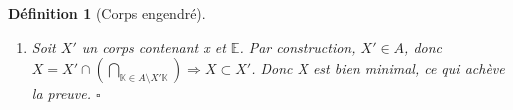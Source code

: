 \documentclass[a4paper,12pt,french]{report}
\newtheorem{definition}{Définition}[section]
\begin{document}
\begin{definition}[Corps engendré]
\begin{preuve}
\begin{enumerate}
\begin{enumerate}
\begin{enumerate}
								\[{}
								\forall \; \mathbb{K} \in A , 
								\left(
								\left\{
								\begin{array}{ll}
									x\in \mathbb{K}\setminus\{0\}\\
									y\in \mathbb{K}\setminus\{0\}
								\end{array}
								\right. \Rightarrow x\times y = y\times x \in \mathbb{K}\setminus\{0\} \right){}
								\]
								Donc \(x\times y = y\times x \in X\setminus\{0\} \){}
							\item 
								Soit \((x,y,z) \in (X\setminus\{0\})^{3} \) on a, 
								\[{}
								\forall \; \mathbb{K} \in A , 
								\left(
								\left\{
								\begin{array}{lll}
									x\in \mathbb{K}\setminus\{0\}\\
									y\in \mathbb{K}\setminus\{0\}\\
									z\in \mathbb{K}\setminus\{0\}
								\end{array}
								\right. \Rightarrow (x+y)+z = x+(y+z) \in \mathbb{K}\setminus\{0\} \right){}
								\]
								Donc \((x + y)+z = x+(y+z) \in X\setminus\{0\} \)
					\end{enumerate}
				\item Montrons la distributivité de \(+\) sur \(\times\) : \\
					Soit \((x,y,z) \in X^{3} \) on a, 
									\[{}
									\forall \; \mathbb{K} \in A , 
									\left(
									\left\{
									\begin{array}{lll}
										x\in \mathbb{K}\\
										y\in \mathbb{K}\\
										z\in \mathbb{K}
									\end{array}
									\right. \Rightarrow x \times (y + z) = (y + z) \times x = xy + xz \in \mathbb{K}\right){}
									\]
									Donc \(x \times (y + z) = (y + z) \times x = xy + xz \in X \)
							
					\end{enumerate}
				
				\item Soit \(X'\) un corps contenant x et \(\mathbb{E}\). Par construction, 
				\(X' \in A \), donc 
				\(X = 
				X'\cap 
				\left(\bigcap_{\mathbb{K}\in A\setminus{X'} \mathbb{K} }\right) \Rightarrow X \subset X '\).{}
				Donc X est bien minimal, ce qui achève la preuve. \(\square\) 
				
				\end{enumerate}
			\end{preuve}
				
			\end{definition}
			
\end{document}
